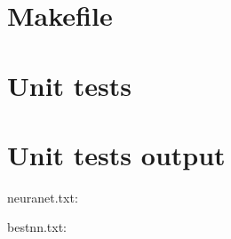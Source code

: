 \section{Makefile}

\begin{scriptsize}
\begin{ttfamily}

\end{ttfamily}
\end{scriptsize}

\section{Unit tests}

\begin{scriptsize}
\begin{ttfamily}

\end{ttfamily}
\end{scriptsize}

\section{Unit tests output}

\begin{scriptsize}
\begin{ttfamily}

\end{ttfamily}
\end{scriptsize}

neuranet.txt:\\
\begin{scriptsize}
\begin{ttfamily}

\end{ttfamily}
\end{scriptsize}

bestnn.txt:\\
\begin{scriptsize}
\begin{ttfamily}

\end{ttfamily}
\end{scriptsize}

